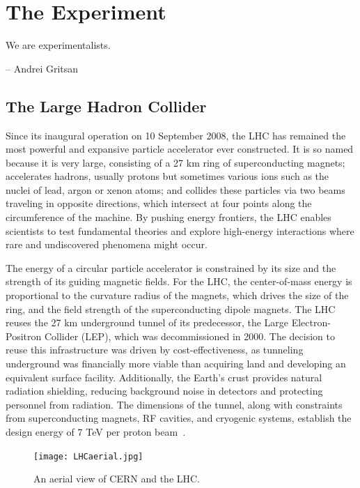 \chapter{The Experiment} \label{chap:chap-3}


\epigraph{We are experimentalists.}{-- Andrei Gritsan}





\section{The Large Hadron Collider}

Since its inaugural operation on 10 September 2008, the LHC has remained the most powerful and expansive particle accelerator ever constructed. It is so named because it is very large, consisting of a 27 km ring of superconducting magnets; accelerates hadrons, usually protons but sometimes various ions such as the nuclei of lead, argon or xenon atoms; and collides these particles via two beams traveling in opposite directions, which intersect at four points along the circumference of the machine. By pushing energy frontiers, the LHC enables scientists to test fundamental theories and explore high-energy interactions where rare and undiscovered phenomena might occur.

The energy of a circular particle accelerator is constrained by its size and the strength of its guiding magnetic fields. For the LHC, the center-of-mass energy is proportional to the curvature radius of the magnets, which drives the size of the ring, and the field strength of the superconducting dipole magnets. The LHC reuses the 27 km underground tunnel of its predecessor, the Large Electron-Positron Collider (LEP), which was decommissioned in 2000. The decision to reuse this infrastructure was driven by cost-effectiveness, as tunneling underground was financially more viable than acquiring land and developing an equivalent surface facility.  Additionally, the Earth's crust provides natural radiation shielding, reducing background noise in detectors and protecting personnel from radiation. The dimensions of the tunnel, along with constraints from superconducting magnets, RF cavities, and cryogenic systems, establish the design energy of 7 TeV per proton beam~\cite{CERNBroc79}.


\begin{figure}[!hbt]
    \begin{center}
        \texttt{[image: LHCaerial.jpg]}
        \caption{An aerial view of CERN and the LHC.}
        \label{fig:LHCaerial}
    \end{center}
\end{figure}

